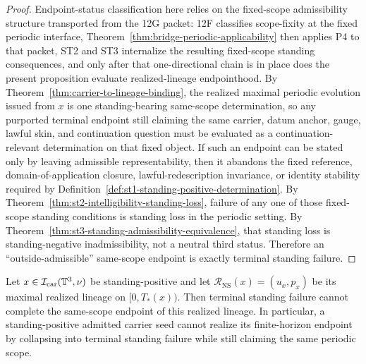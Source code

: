 \begin{proof}
Endpoint-status classification here relies on the fixed-scope admissibility structure transported from the 12G packet: 12F classifies scope-fixity at the fixed periodic interface, Theorem~\ref{thm:bridge-periodic-applicability} then applies P4 to that packet, ST2 and ST3 internalize the resulting fixed-scope standing consequences, and only after that one-directional chain is in place does the present proposition evaluate realized-lineage endpointhood. By Theorem~\ref{thm:carrier-to-lineage-binding}, the realized maximal periodic evolution issued from $x$ is one standing-bearing same-scope determination, so any purported terminal endpoint still claiming the same carrier, datum anchor, gauge, lawful skin, and continuation question must be evaluated as a continuation-relevant determination on that fixed object. If such an endpoint can be stated only by leaving admissible representability, then it abandons the fixed reference, domain-of-application closure, lawful-redescription invariance, or identity stability required by Definition~\ref{def:st1-standing-positive-determination}. By Theorem~\ref{thm:st2-intelligibility-standing-loss}, failure of any one of those fixed-scope standing conditions is standing loss in the periodic setting. By Theorem~\ref{thm:st3-standing-admissibility-equivalence}, that standing loss is standing-negative inadmissibility, not a neutral third status. Therefore an ``outside-admissible'' same-scope endpoint is exactly terminal standing failure.
\end{proof}

\begin{manualproposition}
\label{prop:terminal-standing-failure-no-endpoint}
Let $x\in\mathcal I_{\mathrm{car}}(\mathbb{T}^3,\nu)$ be standing-positive and let
$\mathcal R_{\mathrm{NS}}(x)=(u_x,p_x)$ be its maximal realized lineage on $[0,T_*(x))$. Then terminal standing failure cannot complete the same-scope endpoint of this realized lineage. In particular, a standing-positive admitted carrier seed cannot realize its finite-horizon endpoint by collapsing into terminal standing failure while still claiming the same periodic scope.
\end{manualproposition}


